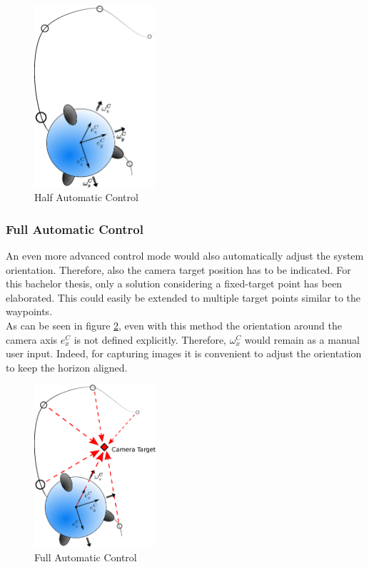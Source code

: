 \begin{figure}[H] %
	\begin{center}
		\includegraphics[width=0.4\textwidth]{HAC.eps}
		\caption[Half automatic control]{Half Automatic Control}  
		\label{fig:half_automatic_control}		
	\end{center}
\end{figure}

\subsubsection{Full Automatic Control}
An even more advanced control mode would also automatically adjust the system orientation. Therefore, also the camera target position has to be indicated. For this bachelor thesis, only a solution considering a fixed-target point has been elaborated. This could easily be extended to multiple target points similar to the waypoints. \\ As can be seen in figure \ref{fig:full_automatic_control}, even with this method the orientation around the camera axis $e_x^C$ is not defined explicitly. Therefore, $\omega_x^C$ would remain as a manual user input. Indeed, for capturing images it is convenient to adjust the orientation to keep the horizon aligned.


\begin{figure}[H] %
	\begin{center}
		\includegraphics[width=0.4\textwidth]{FAComega.eps}
		\caption[Full automatic control]{Full Automatic Control}  
		\label{fig:full_automatic_control}		
	\end{center}
\end{figure}